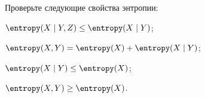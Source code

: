 Проверьте следующие свойства энтропии:
\begin{enumcyr}
    \item $\entropy(X \mid Y, Z) \le \entropy(X \mid Y)$;
    \item $\entropy(X, Y) = \entropy(X) + \entropy(X \mid Y)$;
    \item $\entropy(X \mid Y) \le \entropy(X)$;
    \item $\entropy(X, Y) \ge \entropy(X)$.
\end{enumcyr}
